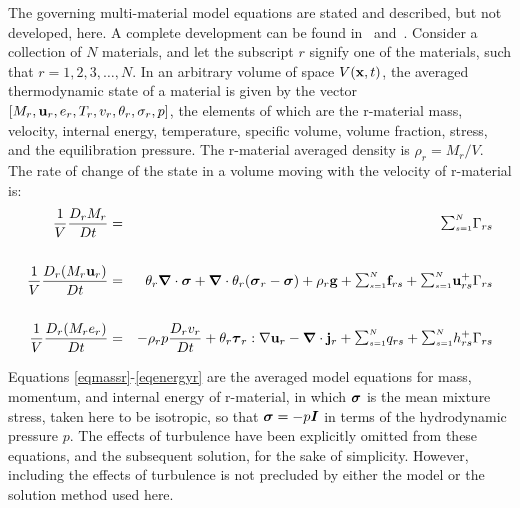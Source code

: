 The governing multi-material model equations are stated and described, but 
not developed, here.  A complete development can be found 
in~\cite{Guilkey2005} and~\cite{Kashiwa2000}.  Consider a collection 
of $N$ materials, and let the subscript $r$ signify one of the 
materials, such that $r = 1, 2, 3, \dots, N$.  In an arbitrary volume of space
$V(\mathbf{x},t)$, the averaged thermodynamic state of a material is given by
the vector 
$[M_r, \mathbf{u}_r, e_r, T_r, v_r, \theta_r, \sigma_r, p]$,
the elements of which are the r-material mass, velocity, internal
energy, temperature, specific volume, volume fraction, stress, and the
equilibration pressure.  The r-material averaged density is
$\rho_r = M_r/V$.  The rate of change of the state in a volume
moving with the velocity of r-material is:
\noindent
\begin{eqnarray}
{1\over V}{D_r M_r \over Dt} &=&
{\raise1.5pt\hbox{$\scriptstyle\sum_{s=1}^N$}}\Gamma_{rs}
\label{eqmassr} \\
\nonumber \\
{1\over V}{D_r (M_r \Bu_r) \over Dt} &=&
\theta_r \Bnabla\cdot\Bsig
+\Bnabla\cdot\theta_r(\Bsig_r - \Bsig) + \rho_r\Bg
+ {\raise1.5pt\hbox{$\scriptstyle\sum_{s=1}^N$}}
\Bf_{rs} + {\raise1.5pt\hbox{$\scriptstyle\sum_{s=1}^N$}}
\Bu_{rs}^+ \Gamma_{rs}
\label{eqmomr}\\ \nonumber \\
{1\over V}{D_r (M_r e_r) \over Dt} &=& -
\rho_r p {D_r v_r\over Dt} +
\theta_r\Btau_r:\nabla\Bu_r - \Bnabla\cdot\Bj_r +
{\raise1.5pt\hbox{$\scriptstyle\sum_{s=1}^N$}} q_{rs} +
{\raise1.5pt\hbox{$\scriptstyle\sum_{s=1}^N$}}
h_{rs}^+ \Gamma_{rs}
\label{eqenergyr}
\end{eqnarray}

Equations \ref{eqmassr}-\ref{eqenergyr} are the averaged model equations
for mass, momentum, and internal energy of r-material, in which $\boldsymbol{\sigma}$ is
the mean mixture stress, taken here to be isotropic, so that $\boldsymbol{\sigma} =
-p\boldsymbol{I}$ in terms of the hydrodynamic pressure $p$.  The effects of turbulence
have been explicitly omitted from these equations, and the subsequent solution,
for the sake of simplicity.  However, including the effects of turbulence is not precluded by either the model or the solution method used here.

